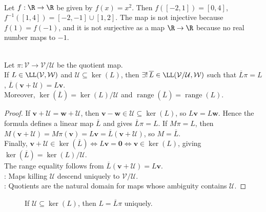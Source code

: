 \begin{example} \label{ex:square-map-image-preimage} \\
Let $f:\R\to\R$ be given by $f(x)=x^2$. Then $f([-2,1])=[0,4]$, $f^{-1}([1,4])=[-2,-1]\cup[1,2]$. The map is not injective because $f(1)=f(-1)$, and it is not surjective as a map $\R\to\R$ because no real number maps to $-1$.
\end{example}

\begin{theorem} \label{thm:quotient-universal-property} \\
Let $\pi:\mathcal{V}\to\mathcal{V}/\mathcal{U}$ be the quotient map.\\
If $L\in\LL(\mathcal{V},\mathcal{W})$ and $\mathcal{U}\subseteq\ker(L)$, then $\exists!\,\overline{L}\in\LL(\mathcal{V}/\mathcal{U},\mathcal{W})$ such that $\overline{L}\pi=L$, $\overline{L}(\mathbf{v}+\mathcal{U})=L\mathbf{v}$.\\
Moreover, $\ker(\overline{L})=\ker(L)/\mathcal{U}$ and $\operatorname{range}(\overline{L})=\operatorname{range}(L)$.
\begin{proof}
If $\mathbf{v}+\mathcal{U}=\mathbf{w}+\mathcal{U}$, then $\mathbf{v}-\mathbf{w}\in\mathcal{U}\subseteq\ker(L)$, so $L\mathbf{v}=L\mathbf{w}$. Hence the formula defines a linear map $\overline{L}$ and gives $\overline{L}\pi=L$. If $M\pi=L$, then $M(\mathbf{v}+\mathcal{U})=M\pi(\mathbf{v})=L\mathbf{v}=\overline{L}(\mathbf{v}+\mathcal{U})$, so $M=\overline{L}$.\\
Finally, $\mathbf{v}+\mathcal{U}\in\ker(\overline{L}) \iff L\mathbf{v}=\mathbf{0} \iff \mathbf{v}\in\ker(L)$, giving $\ker(\overline{L})=\ker(L)/\mathcal{U}$.\\
The range equality follows from $\overline{L}(\mathbf{v}+\mathcal{U})=L\mathbf{v}$.\\
: Maps killing $\mathcal{U}$ descend uniquely to $\mathcal{V}/\mathcal{U}$.\\
: Quotients are the natural domain for maps whose ambiguity contains $\mathcal{U}$.
\end{proof}
\end{theorem}

\begin{figure}[H]
  \centering
  
  \caption{If $\mathcal{U}\subseteq\ker(L)$, then $L=\overline{L}\pi$ uniquely.}
  \label{fig:quotient-universal-property}
\end{figure}


